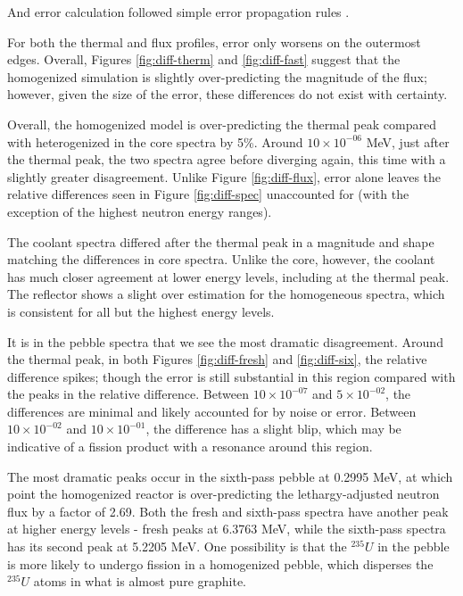 And error calculation followed simple error propagation rules \cite{noauthor_uncertainties_nodate}.




For both the thermal and flux profiles, error only worsens on the outermost edges.  Overall, Figures \ref{fig:diff-therm} and \ref{fig:diff-fast} suggest that the homogenized simulation is slightly over-predicting the magnitude of the flux; however, given the size of the error, these differences do not exist with certainty.




Overall, the homogenized model is over-predicting the thermal peak compared with heterogenized in the core spectra by 5\%.  Around $10\times10^{-06}$ MeV, just after the thermal peak, the two spectra agree before diverging again, this time with a slightly greater disagreement.  Unlike Figure \ref{fig:diff-flux}, error alone leaves the relative differences seen in Figure \ref{fig:diff-spec} unaccounted for (with the exception of the highest neutron energy ranges).

The coolant spectra differed after the thermal peak in a magnitude and shape matching the differences in core spectra.  Unlike the core, however, the coolant has much closer agreement at lower energy levels, including at the thermal peak.  The reflector shows a slight over estimation for the homogeneous spectra, which is consistent for all but the highest energy levels.

It is in the pebble spectra that we see the most dramatic disagreement.  Around the thermal peak, in both Figures \ref{fig:diff-fresh} and \ref{fig:diff-six}, the relative difference spikes; though the error is still substantial in this region compared with the peaks in the relative difference.  Between $10\times10^{-07}$ and $5\times10^{-02}$, the differences are minimal and likely accounted for by noise or error.  Between $10\times10^{-02}$ and $10\times10^{-01}$, the difference has a slight blip, which may be indicative of a fission product with a resonance around this region.

The most dramatic peaks occur in the sixth-pass pebble at 0.2995 MeV, at which point the homogenized reactor is over-predicting the lethargy-adjusted neutron flux by a factor of 2.69.  Both the fresh and sixth-pass spectra have another peak at higher energy levels - fresh peaks at 6.3763 MeV, while the sixth-pass spectra has its second peak at 5.2205 MeV.  One possibility is that the $^{235}U$ in the pebble is more likely to undergo fission in a homogenized pebble, which disperses the $^{235}U$ atoms in what is almost pure graphite.



